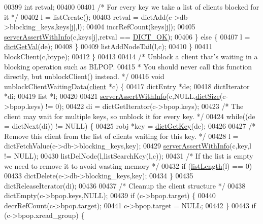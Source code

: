 \begin{DoxyCode}
00399             \textcolor{keywordtype}{int} retval;
00400 
00401             \textcolor{comment}{/* For every key we take a list of clients blocked for it */}
00402             l = listCreate();
00403             retval = dictAdd(c->db->blocking\_keys,keys[j],l);
00404             incrRefCount(keys[j]);
00405             \hyperlink{server_8h_a7308f76cbff9a8d3797fe78190b91282}{serverAssertWithInfo}(c,keys[j],retval == 
      \hyperlink{dict_8h_a2afecbeab8f7efbc183048f52f6d17e5}{DICT\_OK});
00406         \} \textcolor{keywordflow}{else} \{
00407             l = \hyperlink{dict_8h_ae8d2cc391873b2bea2b87c4f80f43120}{dictGetVal}(de);
00408         \}
00409         listAddNodeTail(l,c);
00410     \}
00411     blockClient(c,btype);
00412 \}
00413 
00414 \textcolor{comment}{/* Unblock a client that's waiting in a blocking operation such as BLPOP.}
00415 \textcolor{comment}{ * You should never call this function directly, but unblockClient() instead. */}
00416 \textcolor{keywordtype}{void} unblockClientWaitingData(\hyperlink{structclient}{client} *c) \{
00417     dictEntry *de;
00418     dictIterator *di;
00419     list *l;
00420 
00421     \hyperlink{server_8h_a7308f76cbff9a8d3797fe78190b91282}{serverAssertWithInfo}(c,NULL,\hyperlink{dict_8h_af193430dd3d5579a52b194512f72c1f0}{dictSize}(c->bpop.keys) != 0);
00422     di = dictGetIterator(c->bpop.keys);
00423     \textcolor{comment}{/* The client may wait for multiple keys, so unblock it for every key. */}
00424     \textcolor{keywordflow}{while}((de = dictNext(di)) != NULL) \{
00425         robj *key = \hyperlink{dict_8h_a3271c334309904a3086deca94f96e46e}{dictGetKey}(de);
00426 
00427         \textcolor{comment}{/* Remove this client from the list of clients waiting for this key. */}
00428         l = dictFetchValue(c->db->blocking\_keys,key);
00429         \hyperlink{server_8h_a7308f76cbff9a8d3797fe78190b91282}{serverAssertWithInfo}(c,key,l != NULL);
00430         listDelNode(l,listSearchKey(l,c));
00431         \textcolor{comment}{/* If the list is empty we need to remove it to avoid wasting memory */}
00432         \textcolor{keywordflow}{if} (\hyperlink{adlist_8h_afde0ab079f934670e82119b43120e94b}{listLength}(l) == 0)
00433             dictDelete(c->db->blocking\_keys,key);
00434     \}
00435     dictReleaseIterator(di);
00436 
00437     \textcolor{comment}{/* Cleanup the client structure */}
00438     dictEmpty(c->bpop.keys,NULL);
00439     \textcolor{keywordflow}{if} (c->bpop.target) \{
00440         decrRefCount(c->bpop.target);
00441         c->bpop.target = NULL;
00442     \}
00443     \textcolor{keywordflow}{if} (c->bpop.xread\_group) \{

\end{DoxyCode}
